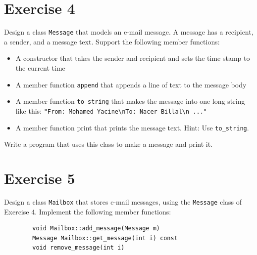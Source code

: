 \documentclass[10pt,a4paper]{article}
\begin{document}
	\section*{Exercise 4}
	Design a class \verb*|Message| that models an e-mail message. A message has a recipient, a
	sender, and a message text. Support the following member functions:
	\begin{itemize}
		\item A constructor that takes the sender and recipient and sets the time stamp to the
		current time
		\item A member function \verb|append| that appends a line of text to the message body
		\item A member function \verb|to_string| that makes the message into one long string like this: \verb|"From: Mohamed Yacine\nTo: Nacer Billal\n ..."|
		\item A member function print that prints the message text. Hint: Use \verb|to_string|.
	\end{itemize}
	Write a program that uses this class to make a message and print it.
	
	\section*{Exercise 5}
	Design a class \verb|Mailbox| that stores e-mail messages, using the \verb|Message| class of Exercise 4. Implement the following member functions:
	\begin{verbatim}
		void Mailbox::add_message(Message m)
		Message Mailbox::get_message(int i) const
		void remove_message(int i)
	\end{verbatim}	
\end{document}
